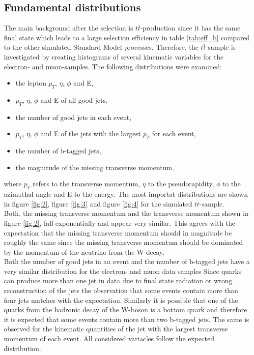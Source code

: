 \begin{table}[H]
  \end{table}


\subsection{Fundamental distributions} \label{sec:sekunde}
The main background after the selection is $t \overline{t}$-production since it has the same final state which leads to a large selection efficiency 
in table \ref{tab:eff_b} compared to the other simulated Standard Model processes. 
Therefore, the $t \overline{t}$-sample is investigated by creating 
histograms of several kinematic variables for the electron- and muon-samples. 
The following distributions were examined:
\begin{itemize}
  \item the lepton $p_T$, $\eta$, $\phi$ and E,
  \item $p_T$, $\eta$, $\phi$ and E  of all good jets,
  \item the number of good jets in each event, 
  \item $p_T$, $\eta$, $\phi$ and E of the jets with the largest $p_T$ for each event,
  \item the number of b-tagged jets, 
  \item the magnitude of the missing transverse momentum, 
\end{itemize}
where $p_T$ refers to the transverse momentum, $\eta$ to the pseudorapidity, $\phi$ to the azimuthal angle and E to the energy. 
The most importat distributions are shown in figure \ref{fig:2}, figure \ref{fig:3} and figure \ref{fig:4} for the simulated $t\overline{t}$-sample. \\
Both, the missing transverse momentum and the transverse momentum shown in figure \ref{fig:2}, fall exponentially and appear very similar. 
This agrees with the expectation that the missing transverse momentum should in magnitude be roughly the same since the missing 
transverse momentum should be dominated by the momentum of the neutrino from the W-decay. \\
Both the number of good jets in an event and the number of b-tagged jets have a very similar distribution for the electron- and muon data samples
Since quarks can produce more than one jet in data due to final state radiation or wrong reconstruction of the jets the observation that some 
events contain more than four jets matches with the expectation. 
Similarly it is possible that one of the quarks from the hadronic decay of the W-boson is a bottom quark and therefore it is expected that some events 
contain more than two b-tagged jets. 
The same is observed for the kinematic quantities of the jet with the largest transverse momentum of each event. All considered variacles follow 
the expected distribution. 

